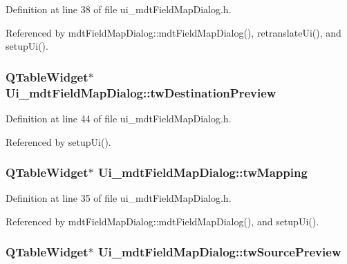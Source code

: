 Definition at line 38 of file ui\-\_\-mdt\-Field\-Map\-Dialog.\-h.



Referenced by mdt\-Field\-Map\-Dialog\-::mdt\-Field\-Map\-Dialog(), retranslate\-Ui(), and setup\-Ui().

\hypertarget{class_ui__mdt_field_map_dialog_afe906fa26ad8f24ee89ddca43d00dcce}{
\subsubsection[{tw\-Destination\-Preview}]{\setlength{\rightskip}{0pt plus 5cm}Q\-Table\-Widget$\ast$ Ui\-\_\-mdt\-Field\-Map\-Dialog\-::tw\-Destination\-Preview}}\label{class_ui__mdt_field_map_dialog_afe906fa26ad8f24ee89ddca43d00dcce}


Definition at line 44 of file ui\-\_\-mdt\-Field\-Map\-Dialog.\-h.



Referenced by setup\-Ui().

\hypertarget{class_ui__mdt_field_map_dialog_a75ba0e1cbf124fb09f2e0d4e90f33c27}{
\subsubsection[{tw\-Mapping}]{\setlength{\rightskip}{0pt plus 5cm}Q\-Table\-Widget$\ast$ Ui\-\_\-mdt\-Field\-Map\-Dialog\-::tw\-Mapping}}\label{class_ui__mdt_field_map_dialog_a75ba0e1cbf124fb09f2e0d4e90f33c27}


Definition at line 35 of file ui\-\_\-mdt\-Field\-Map\-Dialog.\-h.



Referenced by mdt\-Field\-Map\-Dialog\-::mdt\-Field\-Map\-Dialog(), and setup\-Ui().

\hypertarget{class_ui__mdt_field_map_dialog_a4359b329034b12ab48019d873f1176f0}{
\subsubsection[{tw\-Source\-Preview}]{\setlength{\rightskip}{0pt plus 5cm}Q\-Table\-Widget$\ast$ Ui\-\_\-mdt\-Field\-Map\-Dialog\-::tw\-Source\-Preview}}\label{class_ui__mdt_field_map_dialog_a4359b329034b12ab48019d873f1176f0}



